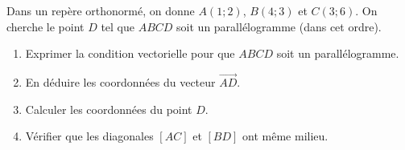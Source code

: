 \documentclass[11pt]{article}
\begin{document}
\begin{exercice}
Dans un repère orthonormé, on donne $A(1;2)$, $B(4;3)$ et $C(3;6)$. On cherche le point $D$ tel que $ABCD$ soit un parallélogramme (dans cet ordre).
\begin{enumerate}
    \item Exprimer la condition vectorielle pour que $ABCD$ soit un parallélogramme.
    \item En déduire les coordonnées du vecteur $\overrightarrow{AD}$.
    \item Calculer les coordonnées du point $D$.
    \item Vérifier que les diagonales $[AC]$ et $[BD]$ ont même milieu.
\end{enumerate}
\end{exercice}
\end{document}

